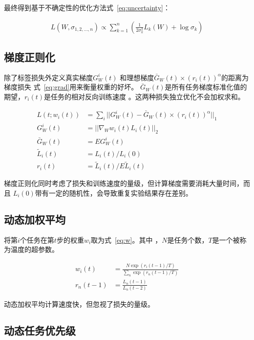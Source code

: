 \documentclass[../main]{subfiles}
\begin{document}
最终得到基于不确定性的优化方法式~\ref{eq:uncertainty}：

\begin{align}
  \label{eq:uncertainty}
  L(W, \sigma_{1, 2, \ldots, n}) \propto \sum_{k = 1}^n(\frac{1}{2\sigma_k^2}L_k(W) + \log\sigma_k)
\end{align}

\subsection{梯度正则化}%
\label{sub:gradnorm}

\cite{DBLP:journals/corr/abs-1711-02257}除了标签损失外定义真实梯度$G_W^i(t)$
和理想梯度$\bar{G}_W(t) \times {(r_i(t))}^\alpha$的距离为梯度损失
式~\ref{eq:grad}用来衡量权重的好坏。
$\bar{G}_W(t)$是所有任务梯度标准化值的期望，$r_i(t)$是任务的相对反向训练速度
。这两种损失独立优化不会加权求和。

\begin{align}
  \label{eq:grad}
  L(t; w_i(t)) & = \sum_i||G_W^i(t) - \bar{G}_W(t) \times {(r_i(t))}^\alpha||_1 \\
  G_W^i(t) & = || \nabla_W w_i(t)L_i(t) ||_2 \\
  \bar{G}_W(t) & = E G_W^i(t) \\
  \tilde{L}_i(t) & = L_i(t)/L_i(0) \\
  r_i(t) & = \tilde{L}_i(t)/E \tilde{L}_i(t)
\end{align}

梯度正则化同时考虑了损失和训练速度的量级，但计算梯度需要消耗大量时间，而且
$L_i(0)$带有一定的随机性，会导致重复实验结果存在差别。

\subsection{动态加权平均}%
\label{sub:dwa}

\cite{Liu_2019_CVPR}将第$i$个任务在第$t$步的权重$w_i$取为式~\ref{eq:w}。其中
，$N$是任务个数，$T$是一个被称为温度的超参数。

\begin{align}
  \label{eq:w}
  w_i(t) & = \frac{N\exp(r_i(t - 1)/T)}{\sum_n\exp(r_n(t - 1)/T)} \\
  r_n(t - 1) & = \frac{L_n(t - 1)}{L_n(t - 2)}
\end{align}

动态加权平均计算速度快，但忽视了损失的量级。

\subsection{动态任务优先级}%
\label{sub:dtp}
\end{document}
